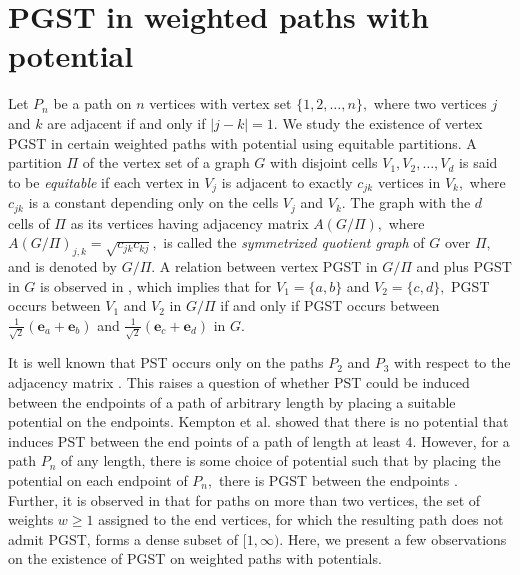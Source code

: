 \documentclass[12pt,a4paper]{article}
\def \e {{\bf e}}
\def \e {{\mathbf e}}
\newcommand{\ob}[1]{\left(#1\right)}
\begin{document}
 \section{PGST in weighted paths with potential}\label{5sec6}
 Let $P_n$ be a path on $n$ vertices with vertex set $\{1,2,\ldots,n\},$ where two vertices $j$ and $k$ are adjacent if and only if $|j-k|=1.$ 
  We study the existence of vertex PGST in certain weighted paths with potential using equitable partitions. A partition $\Pi$ of the vertex set of a graph $G$ with disjoint cells $V_1, V_2, \ldots, V_d$ is said to be \textit{equitable} if each vertex in $V_j$ is adjacent to exactly $c_{jk}$ vertices in $V_k,$ where 
$c_{jk}$ is a constant depending only on the cells $V_j$ and $V_k$. 
The graph with the $d$ cells of $\Pi$ as its vertices having adjacency matrix $A(G/\Pi),$ where $A(G/\Pi)_{j,k}=\sqrt{c_{jk}c_{kj}},$ is called the \textit{symmetrized quotient graph} of $G$ over $\Pi,$ and is denoted by $G/\Pi.$ A relation between vertex PGST in $G/\Pi$ and plus PGST in $G$ is observed in \cite[Remark 5]{god8}, which implies that for $V_1=\{a,b\}$ and $V_2=\{c,d\},$ PGST occurs between $V_1$ and $V_2$ in $G/\Pi$ if and only if PGST occurs between $\frac{1}{\sqrt{2}}\ob{\e_a+\e_b}$ and $\frac{1}{\sqrt{2}}\ob{\e_c+\e_d}$ in $G.$

It is well known that PST occurs only on the paths $P_2$ and $P_3$ with respect to the adjacency matrix \cite{god1}. This raises a question of whether PST could be induced between the endpoints of
a path of arbitrary length by placing a suitable potential on the endpoints. Kempton et al. \cite{kem1} showed that there is no potential that induces PST between the end
points of a path of length at least $4.$ However, for a path $P_n$ of any length, there is some choice of potential such that by
placing the potential on each endpoint of $P_n,$ there is PGST between the endpoints \cite{kem2}. 
  Further, it is observed in \cite{kirk5} that for paths on more than two vertices, the set of weights $w\geq 1$ assigned to the end vertices, for which the resulting path does not admit PGST, forms a dense subset of $[1,\infty).$ 
Here, we present a few observations on the existence of PGST on weighted paths with potentials.
\end{document}

